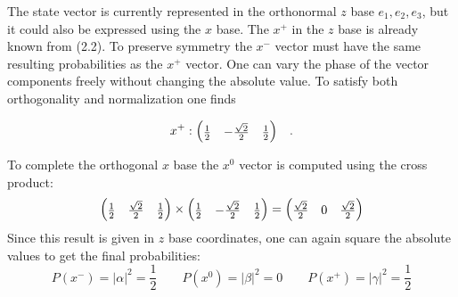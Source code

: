 \documentclass{theoblatt}
\begin{document}
\ttask The state vector is currently represented in the orthonormal $z$ base $e_1, e_2, e_3$, but it could also be expressed using the $x$ base. The $x^+$ in the $z$ base is already known from (2.2). To preserve symmetry the $x^-$ vector must have the same resulting probabilities as the $x^+$ vector. One can vary the phase of the vector components freely without changing the absolute value. To satisfy both orthogonality and normalization one finds

\[ x^+ : \mqty(\frac12 & -\frac{\sqrt2}2 & \frac12) \quad. \]

To complete the orthogonal $x$ base the $x^0$ vector is computed using the cross product:
\begin{gather*}
    \mqty(\frac12 & \frac{\sqrt2}2 & \frac12) \times \mqty(\frac12 & -\frac{\sqrt2}2 & \frac12)
    = \mqty(\frac{\sqrt2}2 & 0 & \frac{\sqrt2}2)
\end{gather*}
Since this result is given in $z$ base coordinates, one can again square the absolute values to get the final probabilities:
\[ P(x^-) = |\alpha|^2 = \frac12 \qquad P(x^0)=|\beta|^2=0 \qquad P(x^+)=|\gamma|^2=\frac12 \]
\end{document}
